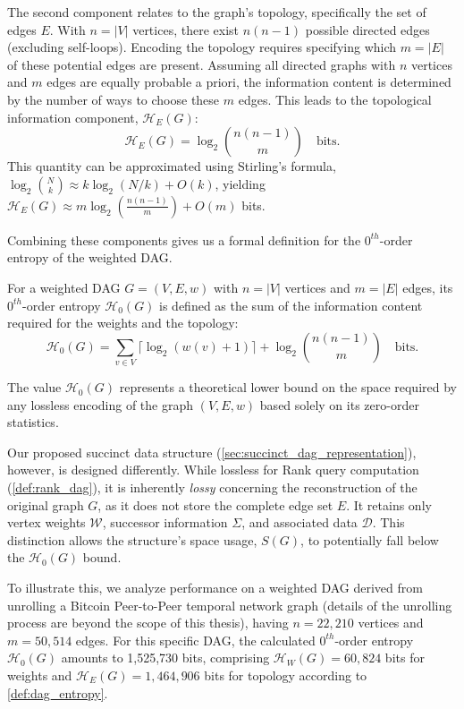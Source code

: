 The second component relates to the graph's topology, specifically the set of edges $E$. With $n = |V|$ vertices, there exist $n(n-1)$ possible directed edges (excluding self-loops). Encoding the topology requires specifying which $m = |E|$ of these potential edges are present. Assuming all directed graphs with $n$ vertices and $m$ edges are equally probable a priori, the information content is determined by the number of ways to choose these $m$ edges. This leads to the topological information component, $\mathcal{H}_E(G)$:
\[ \mathcal{H}_E(G) = \log_2 \binom{n(n-1)}{m} \quad \text{bits}. \]
This quantity can be approximated using Stirling's formula, $\log_2 \binom{N}{k} \approx k \log_2(N/k) + O(k)$, yielding $\mathcal{H}_E(G) \approx m \log_2 \left( \frac{n(n-1)}{m} \right) + O(m)$ bits.

Combining these components gives us a formal definition for the $0^{th}$-order entropy of the weighted DAG.

\begin{definition}
    \label{def:dag_entropy}
    For a weighted DAG $G = (V, E, w)$ with $n=|V|$ vertices and $m=|E|$ edges, its $0^{th}$-order entropy $\mathcal{H}_0(G)$ is defined as the sum of the information content required for the weights and the topology:
    \[ \mathcal{H}_0(G) = \sum_{v \in V} \lceil \log_2 (w(v)+1) \rceil + \log_2 \binom{n(n-1)}{m} \quad \text{bits}. \]
\end{definition}

The value $\mathcal{H}_0(G)$ represents a theoretical lower bound on the space required by any lossless encoding of the graph $(V, E, w)$ based solely on its zero-order statistics.

Our proposed succinct data structure (\autoref{sec:succinct_dag_representation}), however, is designed differently. While lossless for Rank query computation (\ref{def:rank_dag}), it is inherently \emph{lossy} concerning the reconstruction of the original graph $G$, as it does not store the complete edge set $E$. It retains only vertex weights $\mathcal{W}$, successor information $\Sigma$, and associated data $\mathcal{D}$. This distinction allows the structure's space usage, $S(G)$, to potentially fall below the $\mathcal{H}_0(G)$ bound.

To illustrate this, we analyze performance on a weighted DAG derived from unrolling a Bitcoin Peer-to-Peer temporal network graph (details of the unrolling process are beyond the scope of this thesis), having $n = 22,210$ vertices and $m = 50,514$ edges. For this specific DAG, the calculated $0^{th}$-order entropy $\mathcal{H}_0(G)$ amounts to 1,525,730 bits, comprising $\mathcal{H}_W(G) = 60,824$ bits for weights and $\mathcal{H}_E(G) = 1,464,906$ bits for topology according to \ref{def:dag_entropy}.

